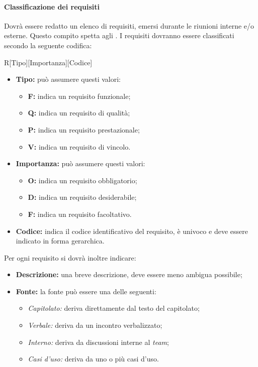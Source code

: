 \paragraph{Classificazione dei requisiti}
Dovrà essere redatto un elenco di requisiti, emersi durante le riunioni interne
e/o esterne. Questo compito spetta agli \textit{\Anas}. I requisiti dovranno
essere classificati secondo la seguente codifica:
\begin{center}
R[Tipo][Importanza][Codice]
\end{center}
\begin{itemize}
  \item \textbf{Tipo:} può assumere questi valori:
  \begin{itemize}
    \item \textbf{F:} indica un requisito funzionale;
    \item \textbf{Q:} indica un requisito di qualità;
    \item \textbf{P:} indica un requisito prestazionale;
    \item \textbf{V:} indica un requisito di vincolo.
  \end{itemize}
  \item \textbf{Importanza:} può assumere questi valori:
  \begin{itemize}
    \item \textbf{O:} indica un requisito obbligatorio;
    \item \textbf{D:} indica un requisito desiderabile;
    \item \textbf{F:} indica un requisito facoltativo.
  \end{itemize}
  \item \textbf{Codice:} indica il codice identificativo del requisito, è
  univoco e deve essere indicato in forma gerarchica.
\end{itemize}
Per ogni requisito si dovrà inoltre indicare:
\begin{itemize}
  \item \textbf{Descrizione:} una breve descrizione, deve essere meno ambigua possibile;
  \item \textbf{Fonte:} la fonte può essere una delle seguenti:
  \begin{itemize}
    \item \textit{Capitolato:} deriva direttamente dal testo del capitolato;
    \item \textit{Verbale:} deriva da un incontro verbalizzato;
    \item \textit{Interno:} deriva da discussioni interne al \textit{team};
    \item \textit{Casi d'uso:} deriva da uno o più casi d'uso.
  \end{itemize}
\end{itemize}
